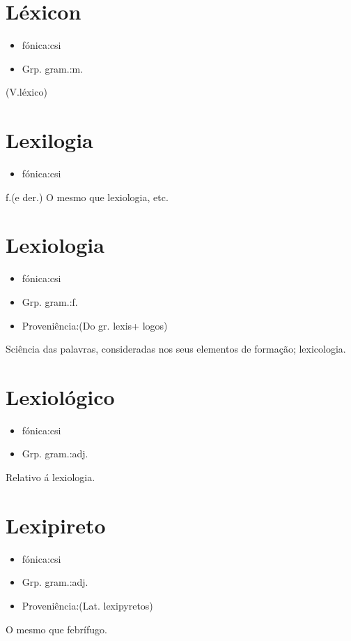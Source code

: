 \section{Léxicon}
\begin{itemize}
\item {fónica:csi}
\end{itemize}
\begin{itemize}
\item {Grp. gram.:m.}
\end{itemize}
(V.léxico)
\section{Lexilogia}
\begin{itemize}
\item {fónica:csi}
\end{itemize}
\textunderscore f.\textunderscore  (e der.)
O mesmo que \textunderscore lexiologia\textunderscore , etc.
\section{Lexiologia}
\begin{itemize}
\item {fónica:csi}
\end{itemize}
\begin{itemize}
\item {Grp. gram.:f.}
\end{itemize}
\begin{itemize}
\item {Proveniência:(Do gr. \textunderscore lexis\textunderscore  + \textunderscore logos\textunderscore )}
\end{itemize}
Sciência das palavras, consideradas nos seus elementos de formação; lexicologia.
\section{Lexiológico}
\begin{itemize}
\item {fónica:csi}
\end{itemize}
\begin{itemize}
\item {Grp. gram.:adj.}
\end{itemize}
Relativo á lexiologia.
\section{Lexipireto}
\begin{itemize}
\item {fónica:csi}
\end{itemize}
\begin{itemize}
\item {Grp. gram.:adj.}
\end{itemize}
\begin{itemize}
\item {Proveniência:(Lat. \textunderscore lexipyretos\textunderscore )}
\end{itemize}
O mesmo que \textunderscore febrífugo\textunderscore .
